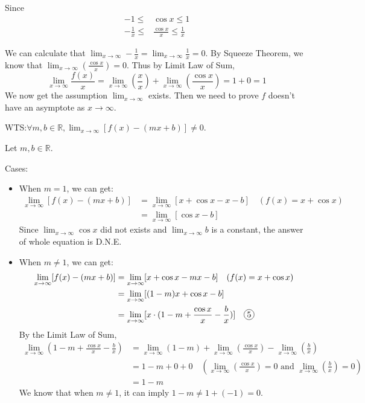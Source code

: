 \documentclass[12pt]{exam}
\newcommand*\circled[1]{\tikz[baseline=(char.base)]{
    \node[shape=circle, draw, inner sep=1pt, 
        minimum height=12pt] (char) {#1};}}
\newcommand{\R}{\mathbb{R}}
\begin{document}
\begin{enumerate}
\begin{enumerate}
		Since
		\begin{align*}
		    -1\leq&\cos{x}\leq1\\
		    -\frac{1}{x}\leq&\frac{\cos{x}}{x}\leq\frac{1}{x}
		\end{align*}
		
		We can calculate that $\lim_{x \to \infty}-\frac{1}{x}=\lim_{x \to \infty}\frac{1}{x}=0$. By Squeeze Theorem, we know that $\lim_{x \to \infty}(\frac{\cos{x}}{x})=0$. Thus by Limit Law of Sum,
		$$
		    \lim_{x \to \infty} \frac{f(x)}{x}=\lim_{x \to \infty}(\frac{x}{x})+\lim_{x \to \infty}(\frac{\cos{x}}{x})=1+0=1
		$$
		We now get the assumption $\lim_{x \to \infty}$ exists. Then we need to prove $f$ doesn't have an asymptote as $x \to \infty$.
		
		WTS:$\forall m,b\in\R,\lim_{x \to \infty}[f(x)-(mx+b)]\neq0.$
		
		Let $m,b\in\R.$
		
		Cases:
		\begin{itemize}
		    \item When $m=1$, we can get:
		    \begin{align*}
		        \lim_{x \to \infty}[f(x)-(mx+b)]&=\lim_{x \to \infty}[x+\cos{x}-x-b]\quad(f(x)=x+\cos{x})\\
		        &=\lim_{x \to \infty}[\cos{x}-b]
		    \end{align*}
		    Since $\lim_{x \to \infty}\cos{x}$ did not exists and $\lim_{x \to \infty}b$ is a constant, the answer of whole equation is D.N.E.
		    \item When $m\neq1$, we can get:
		    \begin{align*}
		        \lim_{x \to \infty}[f(x)-(mx+b)]&=\lim_{x \to \infty}[x+\cos{x}-mx-b]\quad(f(x)=x+\cos{x})\\
		        &=\lim_{x \to \infty}[(1-m)x+\cos{x}-b]\\
		        &=\lim_{x \to \infty}[x\cdot(1-m+\frac{\cos{x}}{x}-\frac{b}{x})] \quad\circled{5}
		    \end{align*}
		    By the Limit Law of Sum,
		    \begin{align*}
		        \lim_{x \to \infty}(1-m+\frac{\cos{x}}{x}-\frac{b}{x})&=\lim_{x \to \infty}(1-m)+\lim_{x \to \infty}(\frac{\cos{x}}{x})-\lim_{x \to \infty}(\frac{b}{x})\\
		        &=1-m+0+0\quad(\lim_{x \to \infty}(\frac{\cos{x}}{x})=0\mbox{ and }\lim_{x \to \infty}(\frac{b}{x})=0)\\
		        &=1-m
		    \end{align*}
		    We know that when $m\neq1$, it can imply $1-m\neq1+(-1)=0$. 
		    

\end{itemize}
\end{enumerate}
\end{enumerate}
\end{document}
